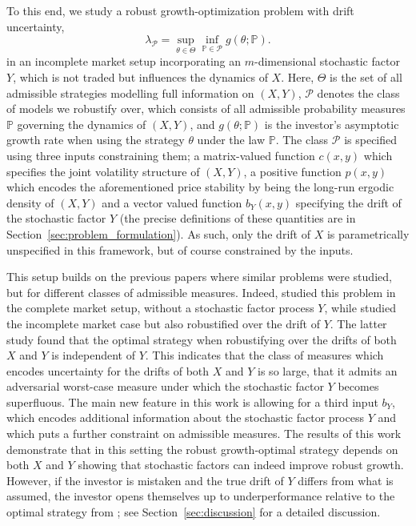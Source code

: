 \documentclass{article}
\theoremstyle{plain}
\theoremstyle{definition}
\renewcommand{\P}{\mathbb{P}}
\newcommand{\Pcal}{{\mathcal P}}
\numberwithin{lem}{section}
\begin{document}
To this end, we study a robust growth-optimization problem with drift uncertainty,
\begin{equation} \label{eqn:lambda_P}
    \lambda_{\Pcal} = \sup_{\theta \in \Theta}\inf_{\P \in \Pcal} g(\theta;\P).
\end{equation}
in an incomplete market setup incorporating an $m$-dimensional stochastic factor $Y$, which is not traded but influences the dynamics of $X$. Here, $\Theta$ is the set of all admissible strategies modelling full information on $(X,Y)$, $\Pcal$ denotes the class of models we robustify over, which consists of all admissible probability measures $\P$ governing the dynamics of $(X,Y)$, and $g(\theta;\P)$ is the investor's asymptotic growth rate when using the strategy $\theta$ under the law $\P$. The class $\Pcal$ is specified using three inputs constraining them; a matrix-valued function $c(x,y)$ which specifies the joint volatility structure of $(X,Y)$, a positive function $p(x,y)$  which encodes the aforementioned price stability by being the long-run ergodic density of $(X,Y)$ and a vector valued function $b_Y(x,y)$ specifying the drift of the stochastic factor $Y$ (the precise definitions of these quantities are in Section~\ref{sec:problem_formulation}). As such, only the drift of $X$ is parametrically unspecified in this framework, but of course constrained by the inputs.

This setup builds on the previous papers \cite{kardaras2021ergodic,itkin2025ergodic} where similar problems were studied, but for different classes of admissible measures. Indeed, \cite{kardaras2021ergodic} studied this problem in the complete market setup, without a stochastic factor process $Y$, while \cite{itkin2025ergodic} studied the incomplete market case but also robustified over the drift of $Y$. The latter study found that the optimal strategy when robustifying over the drifts of both $X$ and $Y$ is independent of $Y$. This indicates that the class of measures which encodes uncertainty for the drifts of both $X$ and $Y$ is so large, that it admits an adversarial worst-case measure under which the stochastic factor $Y$ becomes superfluous. The main new feature in this work is allowing for a third input $b_Y$, which encodes additional information about the stochastic factor process $Y$ and which puts a further constraint on admissible measures. The results of this work demonstrate that in this setting the robust growth-optimal strategy depends on both $X$ and $Y$ showing that stochastic factors can indeed improve robust growth. However, if the investor is mistaken and the true drift of $Y$ differs from what is assumed, the investor opens themselves up to underperformance relative to the optimal strategy from \cite{itkin2025ergodic}; see Section~\ref{sec:discussion} for a detailed discussion.
\end{document}
